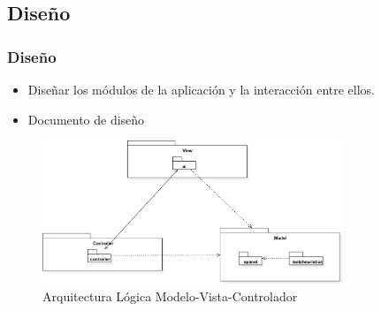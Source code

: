 \documentclass[9pt]{beamer}
\begin{document}
    \subsection{Diseño}
    \begin{frame}
        \frametitle{Diseño}                 
               
        \begin{itemize}
            \item Diseñar los módulos de la aplicación y la interacción entre ellos.
            \item Documento de diseño
        \end{itemize}

        \begin{figure}
            \includegraphics[width=0.8\textwidth]{assets/ArquitecturaLogica.eps}
            \caption{Arquitectura Lógica Modelo-Vista-Controlador}
        \end{figure}

    \end{frame}


\end{document}
